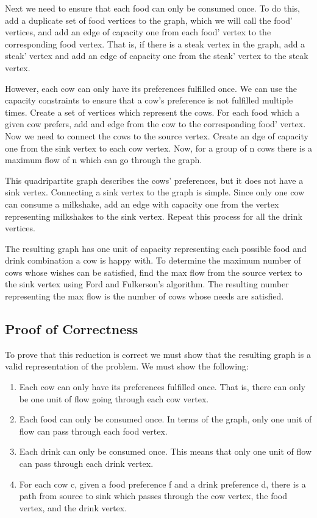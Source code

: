 \documentclass[12pt,letterpaper]{article}
\begin{document}
Next we need to ensure that each food can only be consumed once. To do this, add a duplicate set of food vertices to the graph, which we will call the food' vertices, and add an edge of capacity one from each food' vertex to the corresponding food vertex. That is, if there is a steak vertex in the graph, add a steak' vertex and add an edge of capacity one from the steak' vertex to the steak vertex.

However, each cow can only have its preferences fulfilled once. We can use the capacity constraints to ensure that a cow's preference is not fulfilled multiple times. Create a set of vertices which represent the cows. For each food which a given cow prefers, add and edge from the cow to the corresponding food' vertex. Now we need to connect the cows to the source vertex. Create an dge of capacity one from the sink vertex to each cow vertex. Now, for a group of n cows there is a maximum flow of n which can go through the graph.

This quadripartite graph describes the cows' preferences, but it does not have a sink vertex. Connecting a sink vertex to the graph is simple. Since only one cow can consume a milkshake, add an edge with capacity one from the vertex representing milkshakes to the sink vertex. Repeat this process for all the drink vertices.

The resulting graph has one unit of capacity representing each possible food and drink combination a cow is happy with. To determine the maximum number of cows whose wishes can be satisfied, find the max flow from the source vertex to the sink vertex using Ford and Fulkerson's algorithm. The resulting number representing the max flow is the number of cows whose needs are satisfied.

\subsection{Proof of Correctness}
To prove that this reduction is correct we must show that the resulting graph is a valid representation of the problem. We must show the following:
\begin{enumerate}
\item Each cow can only have its preferences fulfilled once. That is, there can only be one unit of flow going through each cow vertex.
\item Each food can only be consumed once. In terms of the graph, only one unit of flow can pass through each food vertex.
\item Each drink can only be consumed once. This means that only one unit of flow can pass through each drink vertex.
\item For each cow c, given a food preference f and a drink preference d, there is a path from source to sink which passes through the cow vertex, the food vertex, and the drink vertex.
\end{enumerate}
\end{document}
